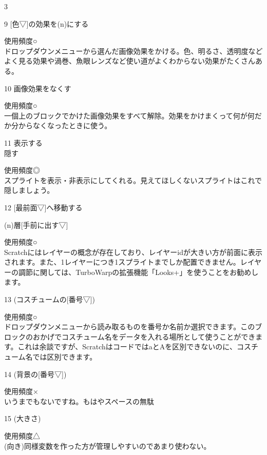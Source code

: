 \documentclass[b5paper,10pt]{jsarticle}
\begin{document}
\begin{multicols*}{3}
\begin{itembox}{9}
[色▽]の効果を(n)にする
\end{itembox}
使用頻度○\\
ドロップダウンメニューから選んだ画像効果をかける。色、明るさ、透明度などよく見る効果や渦巻、魚眼レンズなど使い道がよくわからない効果がたくさんある。
\begin{itembox}{10}
画像効果をなくす
\end{itembox}
使用頻度○\\
一個上のブロックでかけた画像効果をすべて解除。効果をかけまくって何が何だか分からなくなったときに使う。
\begin{itembox}{11}
表示する\\隠す
\end{itembox}
使用頻度◎\\
スプライトを表示・非表示にしてくれる。見えてほしくないスプライトはこれで隠しましょう。
\begin{itembox}{12}
[最前面▽]へ移動する

(n)層[手前に出す▽]
\end{itembox}
使用頻度○\\
Scratchにはレイヤーの概念が存在しており、レイヤーidが大きい方が前面に表示されます。また、1レイヤーにつき1スプライトまでしか配置できません。レイヤーの調節に関しては、TurboWarpの拡張機能「Looks+」を使うことをお勧めします。
\begin{itembox}{13}
(コスチュームの[番号▽])
\end{itembox}
使用頻度○\\
ドロップダウンメニューから読み取るものを番号か名前か選択できます。このブロックのおかげでコスチューム名をデータを入れる場所として使うことができます。これは余談ですが、ScratchはコードではaとAを区別できないのに、コスチューム名では区別できます。
\begin{itembox}{14}
(背景の[番号▽])
\end{itembox}
使用頻度×\\
いうまでもないですね。もはやスペースの無駄
\begin{itembox}{15}
(大きさ)
\end{itembox}
使用頻度△\\
(向き)同様変数を作った方が管理しやすいのであまり使わない。


\end{multicols*}
\end{document}
